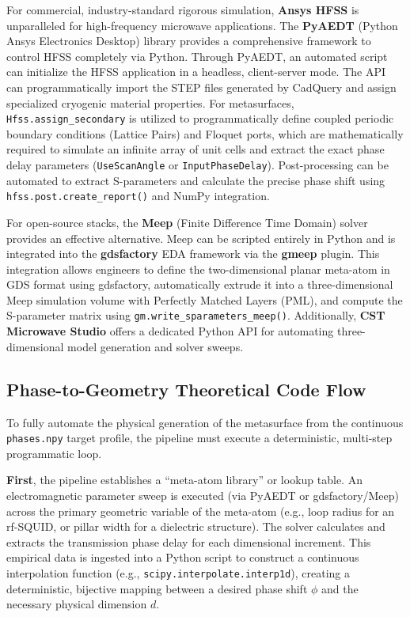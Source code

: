 \documentclass[11pt, a4paper]{article}
\begin{document}
For commercial, industry-standard rigorous simulation, \textbf{Ansys HFSS} is unparalleled for high-frequency microwave applications. The \textbf{PyAEDT} (Python Ansys Electronics Desktop) library provides a comprehensive framework to control HFSS completely via Python. Through PyAEDT, an automated script can initialize the HFSS application in a headless, client-server mode. The API can programmatically import the STEP files generated by CadQuery and assign specialized cryogenic material properties. For metasurfaces, \texttt{Hfss.assign\_secondary} is utilized to programmatically define coupled periodic boundary conditions (Lattice Pairs) and Floquet ports, which are mathematically required to simulate an infinite array of unit cells and extract the exact phase delay parameters (\texttt{UseScanAngle} or \texttt{InputPhaseDelay}). Post-processing can be automated to extract S-parameters and calculate the precise phase shift using \texttt{hfss.post.create\_report()} and NumPy integration.

For open-source stacks, the \textbf{Meep} (Finite Difference Time Domain) solver provides an effective alternative. Meep can be scripted entirely in Python and is integrated into the \textbf{gdsfactory} EDA framework via the \textbf{gmeep} plugin. This integration allows engineers to define the two-dimensional planar meta-atom in GDS format using gdsfactory, automatically extrude it into a three-dimensional Meep simulation volume with Perfectly Matched Layers (PML), and compute the S-parameter matrix using \texttt{gm.write\_sparameters\_meep()}. Additionally, \textbf{CST Microwave Studio} offers a dedicated Python API for automating three-dimensional model generation and solver sweeps.

\subsection{Phase-to-Geometry Theoretical Code Flow}

To fully automate the physical generation of the metasurface from the continuous \texttt{phases.npy} target profile, the pipeline must execute a deterministic, multi-step programmatic loop.

\textbf{First}, the pipeline establishes a ``meta-atom library'' or lookup table. An electromagnetic parameter sweep is executed (via PyAEDT or gdsfactory/Meep) across the primary geometric variable of the meta-atom (e.g., loop radius for an rf-SQUID, or pillar width for a dielectric structure). The solver calculates and extracts the transmission phase delay for each dimensional increment. This empirical data is ingested into a Python script to construct a continuous interpolation function (e.g., \texttt{scipy.interpolate.interp1d}), creating a deterministic, bijective mapping between a desired phase shift $\phi$ and the necessary physical dimension $d$.
\end{document}
